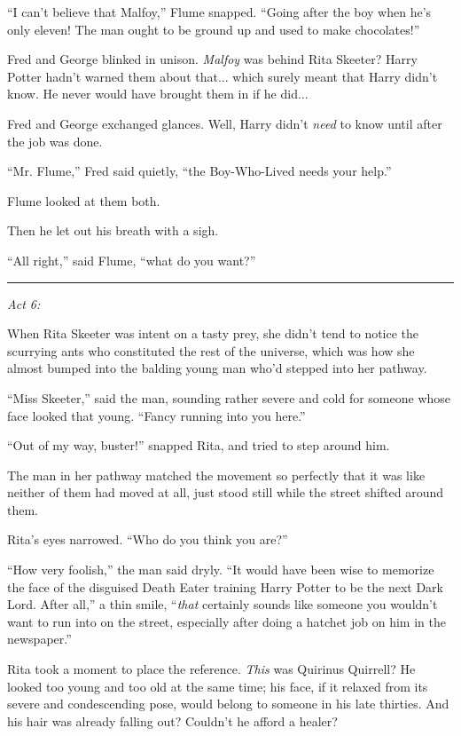 ``I can't believe that Malfoy,'' Flume snapped. ``Going after the boy when he's only eleven! The man ought to be ground up and used to make chocolates!''

Fred and George blinked in unison. \emph{Malfoy} was behind Rita Skeeter? Harry Potter hadn't warned them about that... which surely meant that Harry didn't know. He never would have brought them in if he did...

Fred and George exchanged glances. Well, Harry didn't \emph{need} to know until after the job was done.

``Mr. Flume,'' Fred said quietly, ``the Boy-Who-Lived needs your help.''

Flume looked at them both.

Then he let out his breath with a sigh.

``All right,'' said Flume, ``what do you want?''

\begin{center}\rule{3in}{0.4pt}\end{center}

\emph{Act 6:}

When Rita Skeeter was intent on a tasty prey, she didn't tend to notice the scurrying ants who constituted the rest of the universe, which was how she almost bumped into the balding young man who'd stepped into her pathway.

``Miss Skeeter,'' said the man, sounding rather severe and cold for someone whose face looked that young. ``Fancy running into you here.''

``Out of my way, buster!'' snapped Rita, and tried to step around him.

The man in her pathway matched the movement so perfectly that it was like neither of them had moved at all, just stood still while the street shifted around them.

Rita's eyes narrowed. ``Who do you think you are?''

``How very foolish,'' the man said dryly. ``It would have been wise to memorize the face of the disguised Death Eater training Harry Potter to be the next Dark Lord. After all,'' a thin smile, ``\emph{that} certainly sounds like someone you wouldn't want to run into on the street, especially after doing a hatchet job on him in the newspaper.''

Rita took a moment to place the reference. \emph{This} was Quirinus Quirrell? He looked too young and too old at the same time; his face, if it relaxed from its severe and condescending pose, would belong to someone in his late thirties. And his hair was already falling out? Couldn't he afford a healer?

